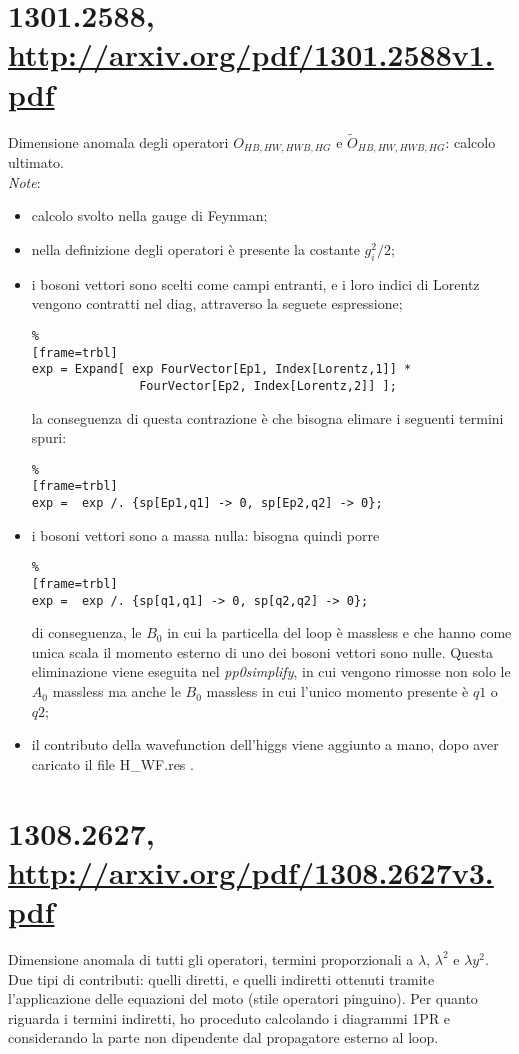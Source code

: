 \documentclass[a4paper,12pt]{article}
\newcommand\la{\lambda}
\newcommand{\bit}{\begin{itemize}}
\newcommand{\eit}{\end{itemize}}
\newcommand{\itm}{\item[-]}
\begin{document}
 


\section*{1301.2588, \url{http://arxiv.org/pdf/1301.2588v1.pdf}}
Dimensione anomala degli operatori $O_{HB,HW,HWB,HG}$ e $\tilde O_{HB,HW,HWB,HG}$: calcolo ultimato.\\
\emph{Note}:
\bit
\itm calcolo svolto nella gauge di Feynman;
\itm nella definizione degli operatori è presente la costante $g_i^2/2$;
\itm i bosoni vettori sono scelti come campi entranti, e i loro indici di Lorentz vengono contratti nel diag, attraverso la seguete espressione; \\
\begin{lstlisting}%
[frame=trbl]
exp = Expand[ exp FourVector[Ep1, Index[Lorentz,1]] *
               FourVector[Ep2, Index[Lorentz,2]] ];
\end{lstlisting}
la conseguenza di questa contrazione è che bisogna elimare i seguenti termini spuri: \\
\begin{lstlisting}%
[frame=trbl]
exp =  exp /. {sp[Ep1,q1] -> 0, sp[Ep2,q2] -> 0};
\end{lstlisting}
\itm i bosoni vettori sono a massa nulla: bisogna quindi porre \\
\begin{lstlisting}%
[frame=trbl]
exp =  exp /. {sp[q1,q1] -> 0, sp[q2,q2] -> 0};
\end{lstlisting}
di conseguenza, le $B_0$ in cui la particella del loop è massless e che hanno come unica scala il momento esterno di uno dei bosoni vettori sono nulle. Questa eliminazione viene eseguita nel \emph{pp0simplify}, in cui vengono rimosse non solo le $A_0$ massless ma anche le $B_0$ massless in cui l'unico momento presente è $q1$ o $q2$;
\itm il contributo della wavefunction dell'higgs viene aggiunto a mano, dopo aver caricato il file H\_WF.res .
\eit



\newpage



\section*{1308.2627, \url{http://arxiv.org/pdf/1308.2627v3.pdf}}
Dimensione anomala di tutti gli operatori, termini proporzionali a $\la$, $\la^2$ e $\la y^2$. Due tipi di contributi: quelli diretti, e quelli indiretti ottenuti tramite l'applicazione delle equazioni del moto (stile operatori pinguino). Per quanto riguarda i termini indiretti, ho proceduto calcolando i diagrammi 1PR e considerando la parte non dipendente dal propagatore esterno al loop.
\end{document}
